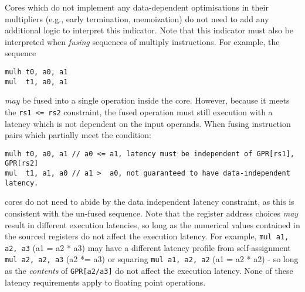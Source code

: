 Cores which do not implement any data-dependent optimisations in their
multipliers (e.g., early termination, memoization) do not need to add
any additional logic to interpret this indicator.
Note that this indicator must also be interpreted when {\em fusing}
sequences of multiply instructions. For example, the sequence
\begin{verbatim}
mulh t0, a0, a1
mul  t1, a0, a1
\end{verbatim}
{\em may} be fused into a single operation inside the core.
However, because it meets the {\tt rs1 <= rs2} constraint, the fused
operation must still execution with a latency which is not dependent on
the input operands.
When fusing instruction pairs which partially meet the condition:
\begin{verbatim}
mulh t0, a0, a1 // a0 <= a1, latency must be independent of GPR[rs1], GPR[rs2]
mul  t1, a1, a0 // a1 >  a0, not guaranteed to have data-independent latency.
\end{verbatim}
cores do not need to abide by the data independent latency constraint,
as this is consistent with the un-fused sequence.
Note that the register address choices {\em may} result in different
execution latencies, so long as the numerical values contained in the
sourced registers do not affect the execution latency.
For example,
{\tt mul a1, a2, a3} (a1 = a2 * a3)
may have a different latency profile from self-assignment
{\tt mul a2, a2, a3} (a2 *= a3)
or squaring
{\tt mul a1, a2, a2} (a1 = a2 * a2) - 
so long as the {\em contents} of {\tt GPR[a2/a3]} do not affect
the execution latency.
None of these latency requirements apply to floating point operations.

